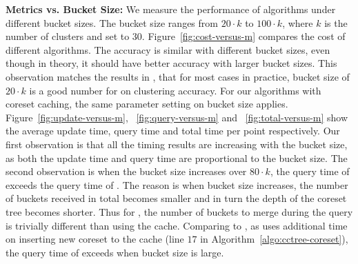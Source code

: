 \noindent\textbf{Metrics vs. Bucket Size:} 
We measure the performance of algorithms under different bucket sizes. 
The bucket size ranges from $20 \cdot k$ to $100 \cdot k$, where $k$ is 
the number of clusters and set to $30$.
Figure~\ref{fig:cost-versus-m} compares the \km cost of different algorithms.
The accuracy is similar with different bucket sizes, even though in theory, it should 
have better accuracy with larger bucket sizes. This observation matches the results 
in \cite{AMR+12}, that for most cases in practice, bucket size of $20 \cdot k$ is a good number 
for \skmpp on clustering accuracy. For our algorithms with coreset caching, the same
parameter setting on bucket size applies.
Figure~\ref{fig:update-versus-m}, ~\ref{fig:query-versus-m} and ~\ref{fig:total-versus-m} 
show the average update time, query time and total time per point respectively.
Our first observation is that all the timing results are increasing with the bucket size, 
as both the update time and query time are proportional to the bucket size.
The second observation is when the bucket size increases over $80 \cdot k$, 
the query time of \cc exceeds the query time of \skmpp. The reason is when 
bucket size increases, the number of buckets received in total becomes smaller 
and in turn the depth of the coreset tree becomes shorter. Thus for \skmpp, 
the number of buckets to merge during the query is trivially different than using 
the cache. Comparing to \skmpp, as \cc uses additional time on inserting new 
coreset to the cache (line $17$ in Algorithm~\ref{algo:cctree-coreset}),
the query time of \cc exceeds \skmpp when bucket size is large. 

